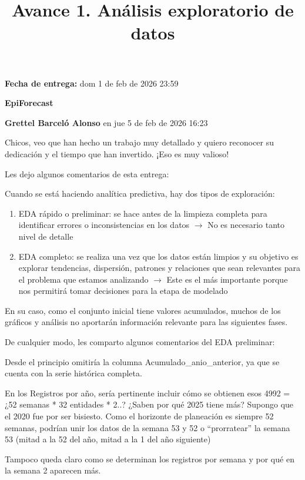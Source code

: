 \documentclass[12pt,a4paper]{article}
\title{Avance 1. Análisis exploratorio de datos}
\date{}
\begin{document}
\maketitle

\noindent\textbf{Fecha de entrega:} dom 1 de feb de 2026 23:59

\bigskip

\noindent\textbf{EpiForecast}

\bigskip

\noindent\textbf{Grettel Barceló Alonso} en jue 5 de feb de 2026 16:23

\bigskip

Chicos, veo que han hecho un trabajo muy detallado y quiero reconocer su dedicación y el tiempo que han invertido. ¡Eso es muy valioso!

Les dejo algunos comentarios de esta entrega:

Cuando se está haciendo analítica predictiva, hay dos tipos de exploración:
\begin{enumerate}
    \item EDA rápido o preliminar: se hace antes de la limpieza completa para identificar errores o inconsistencias en los datos $\rightarrow$ No es necesario tanto nivel de detalle
    \item EDA completo: se realiza una vez que los datos están limpios y su objetivo es explorar tendencias, dispersión, patrones y relaciones que sean relevantes para el problema que estamos analizando $\rightarrow$ Este es el más importante porque nos permitirá tomar decisiones para la etapa de modelado
\end{enumerate}

En su caso, como el conjunto inicial tiene valores acumulados, muchos de los gráficos y análisis no aportarán información relevante para las siguientes fases.

De cualquier modo, les comparto algunos comentarios del EDA preliminar:

Desde el principio omitiría la columna Acumulado\_anio\_anterior, ya que se cuenta con la serie histórica completa.

En los Registros por año, sería pertinente incluir cómo se obtienen esos 4992 = ¿52 semanas * 32 entidades * 2..? ¿Saben por qué 2025 tiene más? Supongo que el 2020 fue por ser bisiesto. Como el horizonte de planeación es siempre 52 semanas, podrían unir los datos de la semana 53 y 52 o ``prorratear'' la semana 53 (mitad a la 52 del año, mitad a la 1 del año siguiente)

Tampoco queda claro como se determinan los registros por semana y por qué en la semana 2 aparecen más.
\end{document}
